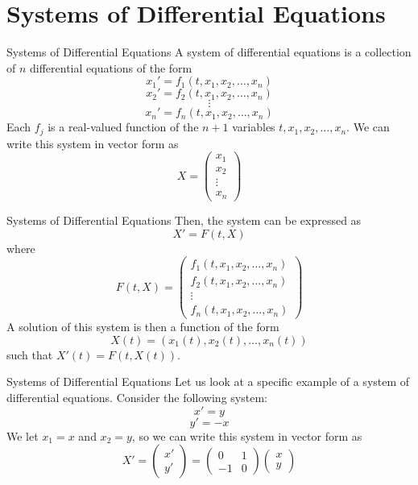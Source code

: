 \documentclass{beamer}
\begin{document}
\section{Systems of Differential Equations}

\begin{frame}{Systems of Differential Equations}
    A system of differential equations is a collection of $n$ differential equations of the form
    \[x_1' = f_1(t, x_1, x_2, \ldots, x_n)\]
    \[x_2' = f_2(t, x_1, x_2, \ldots, x_n)\]
    \[\vdots\]
    \[x_n' = f_n(t, x_1, x_2, \ldots, x_n)\]
    Each $f_j$ is a real-valued function of the $n+1$ variables $t, x_1, x_2, \ldots, x_n$. We can write this system in vector form as
    \[
        X=
        \begin{pmatrix}
            x_1 \\
            x_2 \\
            \vdots \\
            x_n
        \end{pmatrix}
    \]
\end{frame}

\begin{frame}{Systems of Differential Equations}
    Then, the system can be expressed as
    \[
        X' = F(t, X)
    \]
    where
    \[F(t, X)=
    \begin{pmatrix}
        f_1(t, x_1, x_2, \ldots, x_n) \\
        f_2(t, x_1, x_2, \ldots, x_n) \\
        \vdots \\
        f_n(t, x_1, x_2, \ldots, x_n)
    \end{pmatrix}
    \]
    A solution of this system is then a function of the form
    \[X(t)=(x_1(t), x_2(t), \ldots, x_n(t))\]
    such that $X'(t) = F(t, X(t))$.
\end{frame}

\begin{frame}{Systems of Differential Equations}
    Let us look at a specific example of a system of differential equations. Consider the following system:
    \[x'=y\]
    \[y'=-x\]
    We let $x_1=x$ and $x_2=y$, so we can write this system in vector form as
    \[X'=
    \begin{pmatrix}
        x' \\
        y'
    \end{pmatrix}=
    \begin{pmatrix}
        0 & 1 \\
        -1 & 0
    \end{pmatrix}
    \begin{pmatrix}
        x \\
        y
    \end{pmatrix}
    \]
\end{frame}
\end{document}
